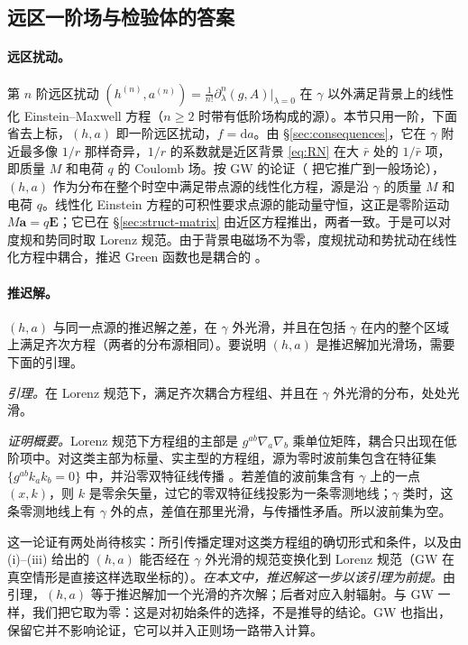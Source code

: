 \documentclass[11pt,a4paper]{ctexart}
\newcommand{\dd}{\mathrm d}
\begin{document}
\subsection{远区一阶场与检验体的答案}\label{sec:first-far}

\paragraph{远区扰动。}第 $n$ 阶远区扰动 $(h^{(n)},a^{(n)})=\tfrac1{n!}\partial^n_\lambda(g,A)|_{\lambda=0}$ 在 $\gamma$ 以外满足背景上的线性化 Einstein--Maxwell 方程（$n\ge2$ 时带有低阶场构成的源）。本节只用一阶，下面省去上标，$(h,a)$ 即一阶远区扰动，$f=\dd a$。由 \S\ref{sec:consequences}，它在 $\gamma$ 附近最多像 $1/r$ 那样奇异，$1/r$ 的系数就是近区背景 \eqref{eq:RN} 在大 $\bar r$ 处的 $1/\bar r$ 项，即质量 $M$ 和电荷 $q$ 的 Coulomb 场。按 GW 的论证（\citealt{Gralla2010} 把它推广到一般场论），$(h,a)$ 作为分布在整个时空中满足带点源的线性化方程，源是沿 $\gamma$ 的质量 $M$ 和电荷 $q$。线性化 Einstein 方程的可积性要求点源的能动量守恒，这正是零阶运动 $M\boldsymbol a=q\boldsymbol E$；它已在 \S\ref{sec:struct-matrix} 由近区方程推出，两者一致。于是可以对度规和势同时取 Lorenz 规范。由于背景电磁场不为零，度规扰动和势扰动在线性化方程中耦合，推迟 Green 函数也是耦合的 \citep{ZimmermanPoisson2014}。

\paragraph{推迟解。}$(h,a)$ 与同一点源的推迟解之差，在 $\gamma$ 外光滑，并且在包括 $\gamma$ 在内的整个区域上满足齐次方程（两者的分布源相同）。要说明 $(h,a)$ 是推迟解加光滑场，需要下面的引理。

\emph{引理。}在 Lorenz 规范下，满足齐次耦合方程组、并且在 $\gamma$ 外光滑的分布，处处光滑。

\emph{证明概要。}Lorenz 规范下方程组的主部是 $g^{ab}\nabla_a\nabla_b$ 乘单位矩阵，耦合只出现在低阶项中。对这类主部为标量、实主型的方程组，源为零时波前集包含在特征集 $\{g^{ab}k_ak_b=0\}$ 中，并沿零双特征线传播 \citep{Hormander1985,Dencker1982}。若差值的波前集含有 $\gamma$ 上的一点 $(x,k)$，则 $k$ 是零余矢量，过它的零双特征线投影为一条零测地线；$\gamma$ 类时，这条零测地线上有 $\gamma$ 外的点，差值在那里光滑，与传播性矛盾。所以波前集为空。

这一论证有两处尚待核实：所引传播定理对这类方程组的确切形式和条件，以及由 (i)--(iii) 给出的 $(h,a)$ 能否经在 $\gamma$ 外光滑的规范变换化到 Lorenz 规范（GW 在真空情形是直接这样选取坐标的）。\emph{在本文中，推迟解这一步以该引理为前提。}由引理，$(h,a)$ 等于推迟解加一个光滑的齐次解；后者对应入射辐射。与 GW 一样，我们把它取为零：这是对初始条件的选择，不是推导的结论。GW 也指出，保留它并不影响论证，它可以并入正则场一路带入计算。
\end{document}
